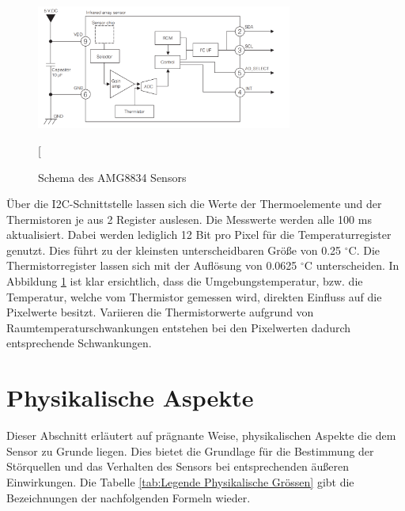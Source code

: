 \begin{figure}[H]
	\centering
	\includegraphics[width=0.75\textwidth]
	{fig/Circuit_AMG8834.PNG}
	\caption[Schema des AMG8834 Sensors]{Schema des AMG8834 Sensors} [\protect\cite{AMG8834]}
	\label{fig:SchemaAMG8834}
\end{figure}
 
Über die \ac{I2C}-Schnittstelle lassen sich die Werte der Thermoelemente und der Thermistoren je aus 2 Register auslesen. Die Messwerte werden alle 100 ms aktualisiert. Dabei werden lediglich 12 Bit pro Pixel für die Temperaturregister genutzt. Dies führt zu der kleinsten unterscheidbaren Größe von 0.25 $^\circ$C. Die Thermistorregister lassen sich mit der Auflösung von 0.0625 $^\circ$C unterscheiden. In Abbildung \ref{fig:SchemaAMG8834} ist klar ersichtlich, dass die Umgebungstemperatur, bzw. die Temperatur, welche vom Thermistor gemessen wird, direkten Einfluss auf die Pixelwerte besitzt. Variieren die Thermistorwerte aufgrund von Raumtemperaturschwankungen entstehen bei den Pixelwerten dadurch entsprechende Schwankungen.

\section{Physikalische Aspekte}
\label{sec:Physik}
Dieser Abschnitt erläutert auf prägnante Weise, physikalischen Aspekte die dem Sensor zu Grunde liegen. Dies bietet die Grundlage für die Bestimmung der Störquellen und das Verhalten des Sensors bei entsprechenden äußeren Einwirkungen. Die Tabelle \ref{tab:Legende Physikalische Grössen} gibt die Bezeichnungen der nachfolgenden Formeln wieder.

